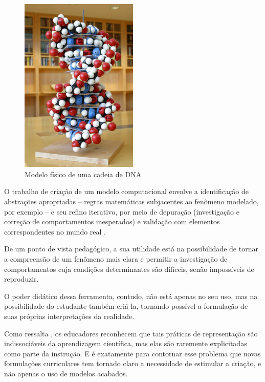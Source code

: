 \begin{figure}[!htb]
  \caption{Modelo físico de uma cadeia de DNA}
	\begin{center}
    \includegraphics[width=0.5\textwidth]{imagens/modelo_fisico.jpg}
	\end{center}
	\label{fig:modelo-fisico}
\end{figure}

O trabalho de criação de um modelo computacional envolve a identificação de abstrações apropriadas -- regras matemáticas subjacentes ao fenômeno modelado, por exemplo -- e seu refino iterativo, por meio de depuração (investigação e correção de comportamentos inesperados) e validação com elementos correspondentes no mundo real \cite{wing2008}.

De um ponto de vista pedagógico, a sua utilidade está na possibilidade de tornar a compreensão de um fenômeno mais clara e permitir a investigação de comportamentos cuja condições determinantes são difíceis, senão impossíveis de reproduzir.

O poder didático dessa ferramenta, contudo, não está apenas no seu uso, mas na possibilidade do estudante também criá-la, tornando possível a formulação de suas próprias interpretações da realidade. 

Como ressalta , os educadores reconhecem que tais práticas de representação são indissociáveis da aprendizagem científica, mas elas são raremente explicitadas como parte da instrução. E é exatamente para contornar esse problema que novas formulações curriculares tem tornado claro a necessidade de estimular a criação, e não apenas o uso de modelos acabados. 

